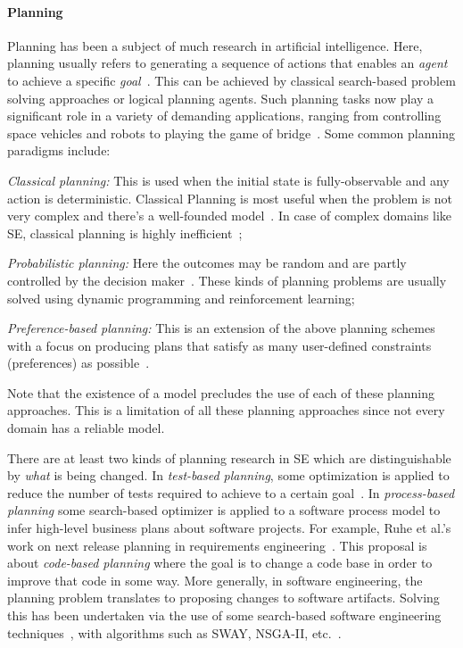 \paragraph{Planning}

Planning  has been a subject of much research in artificial intelligence. Here, planning usually refers to generating a sequence of actions that enables an \textit{agent} to achieve a specific \textit{goal}~\cite{norvig}. This can be achieved by classical search-based problem solving  approaches or logical planning agents. Such planning tasks now play a significant role in a variety of demanding applications, ranging from controlling space vehicles and robots to playing the game of bridge~\cite{ghallab04}. Some common planning paradigms include: 
\be
\item[(a)] \textit{Classical planning:} This is used when the initial state is fully-observable and any action is deterministic. Classical Planning is most useful when the problem is not very complex and there's a well-founded model~\cite{strips,wooldridge95}. In case of complex domains like SE, classical planning is highly inefficient~\cite{ghallab04}; 
\item[(b)] \textit{Probabilistic planning:} Here the outcomes may be random and are partly controlled by the decision maker~\cite{Bel, altman99, guo2009}. These kinds of planning problems are usually solved using dynamic programming and reinforcement learning\cite{ghallab04}; 
\item[(c)] \textit{Preference-based planning:} This is an extension of the above planning schemes with a focus on producing plans that satisfy as many user-defined constraints (preferences) as possible~\cite{son06 , baier09}. 
\ee

Note that the existence of a model precludes the use of each of these planning approaches. This is a limitation of all these planning approaches since not every domain has a reliable model. 

There are at least two kinds of planning research in SE which are distinguishable by {\em what} is being changed. In {\em test-based planning}, some optimization is applied to reduce the number of tests required to achieve to a certain goal~\cite{tallam2006concept, yoo2012regression, blue2013interaction}. In {\em process-based planning} some search-based optimizer is applied to a software process model to infer high-level business plans about software projects. For example, Ruhe et al.'s work on next release planning in requirements engineering~\cite{ruhe2003quantitative, ruhe2010product}. This proposal is about {\em code-based planning} where the goal is to change a code base in order to improve that code in some way. More generally, in software engineering, the planning problem translates to proposing changes to software artifacts. Solving this has been undertaken via the use of some search-based software engineering techniques~\cite{Harman2009}, with algorithms such as SWAY, NSGA-II, etc.~\cite{Nair2016,deb00a}.

